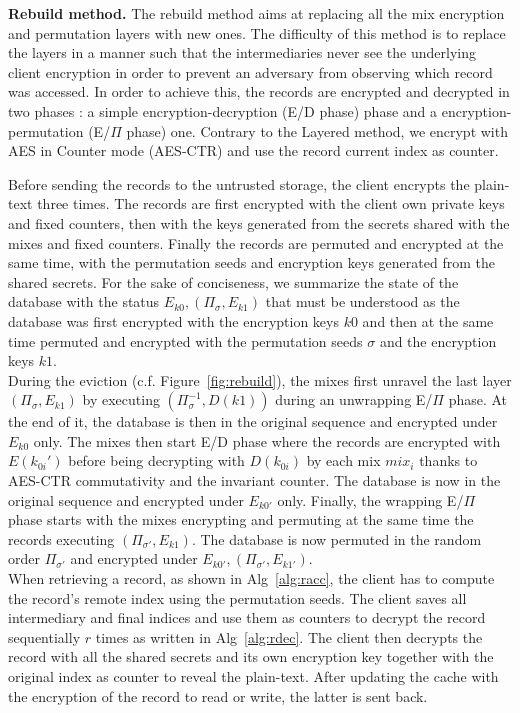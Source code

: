 \documentclass[USenglish,oneside,twocolumn]{article}
\begin{document}
\noindent\textbf{Rebuild method.} The rebuild method aims at replacing all the mix encryption and permutation layers with new ones. The difficulty of this method is to replace the layers in a manner such that the intermediaries never see the underlying client encryption in order to prevent an adversary from observing which record was accessed.
In order to achieve this, the records are encrypted and decrypted in two phases : a simple encryption-decryption (E/D phase) phase and a encryption-permutation (E/$\Pi$ phase) one. Contrary to the Layered method, we encrypt with AES in Counter mode (AES-CTR) and use the record current index as counter.

Before sending the records to the untrusted storage, the client encrypts the plain-text three times. The records are first encrypted with the client own private keys and fixed counters, then with the keys generated from the secrets shared with the mixes and fixed counters. Finally the records are permuted and encrypted at the same time, with the permutation seeds and encryption keys generated from the shared secrets.
For the sake of conciseness, we summarize the state of the database with the status $E_{k0}, (\Pi_\sigma, E_{k1})$ that must be understood as the database was first encrypted with the encryption keys $k0$ and then at the same time permuted and encrypted with the permutation seeds $\sigma$ and the encryption keys $k1$.\\

During the eviction (c.f. Figure~\ref{fig:rebuild}), the mixes first unravel the last layer $(\Pi_\sigma, E_{k1})$ by executing $(\Pi_{\sigma}^{-1}, D(k1))$ during an unwrapping E/$\Pi$ phase. At the end of it, the database is then in the original sequence and encrypted under $E_{k0}$ only. 
The mixes then start E/D phase where the records are encrypted with $E(k_{0i}')$ before being decrypting with $D(k_{0i})$ by each mix $mix_i$ thanks to AES-CTR commutativity and the invariant counter. The database is now in the original sequence and encrypted under $E_{k0'}$ only. Finally, the wrapping E/$\Pi$ phase starts with the mixes encrypting and permuting at the same time the records executing $(\Pi_{\sigma'}, E_{k1})$. The database is now permuted in the random order $\Pi_{\sigma'}$ and encrypted under $E_{k0'}, (\Pi_{\sigma'}, E_{k1'})$.\\  

When retrieving a record, as shown in Alg~\ref{alg:racc}, the client has to compute the record's remote index using the permutation seeds. The client saves all intermediary and final indices and use them as counters to decrypt the record sequentially $r$ times as written in Alg~\ref{alg:rdec}. The client then decrypts the record with all the shared secrets and its own encryption key together with the original index as counter to reveal the plain-text. After updating the cache with the encryption of the record to read or write, the latter is sent back.
\end{document}
